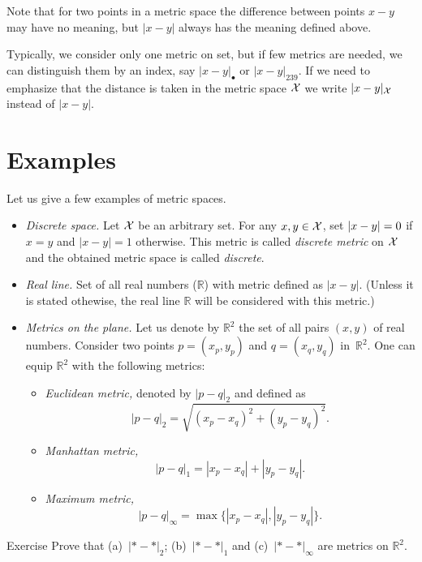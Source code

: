 Note that for two points in a metric space  the difference between points $x-y$ may have no meaning,
but $|x-y|$ always has the meaning defined above.

Typically, we consider only one metric on set, 
but if few metrics are needed, we can distinguish them by an index, say  $|x-y|_{\bullet}$ or $|x-y|_{239}$.
If we need to emphasize that the distance is taken in the metric space $\mathcal{X}$ we write $|x-y|_{\mathcal X}$ instead of $|x-y|$.

\section{Examples}\label{sec:examples(metric-spaces)}

Let us give a few examples of metric spaces.

\begin{itemize}
\item\emph{Discrete space.}\label{page:Discrete metric} Let $\mathcal X$ be an arbitrary set. 
For any $x,y\z\in\c X$, 
set $|x-y|\z=0$ if $x=y$ and $|x-y|=1$ otherwise.
This metric is called \emph{discrete metric} on $\mathcal X$ and the obtained metric space is called \emph{discrete}.
\item{}\emph{Real line.} 
Set of all real numbers ($\mathbb{R}$) with metric defined as 
$|x-y|$. 
(Unless it is stated othewise, the real line $\mathbb{R}$ will be considered with this metric.) 
\item {}\emph{Metrics on the plane.}\label{page:Metrics on the plane}
Let us denote by $\mathbb{R}^2$ the set of all pairs $(x,y)$ of real numbers.
Consider two points $p=(x_p,y_p)$ and $q=(x_q,y_q)$  in~$\mathbb{R}^2$.
One can equip $\mathbb{R}^2$ with the following metrics:
\begin{itemize}
\item{}\emph{Euclidean metric,} denoted by $|p-q|_2$  and defined as
$$|p-q|_2=\sqrt{(x_p-x_q)^2+(y_p-y_q)^2}.$$
\item\label{Manhattan plane}\emph{Manhattan metric,}  
$$|p-q|_1=|x_p-x_q|+|y_p-y_q|.$$
\item{}\emph{Maximum metric,} 
$$|p-q|_\infty=\max\{|x_p-x_q|,|y_p-y_q|\}.$$
\end{itemize}
\end{itemize}

\begin{thm}{Exercise}\label{ex:d1+d2+dinfty}
Prove that (a)~$|{*}-{*}|_2$; (b)~$|{*}-{*}|_1$ and (c)~$|{*}-{*}|_\infty$ are metrics on $\mathbb{R}^2$.
\end{thm}

